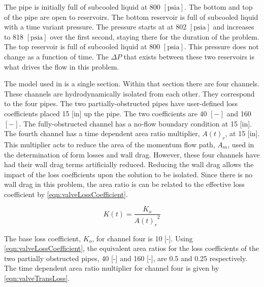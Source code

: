The pipe is initially full of subcooled liquid at 800 $[ \text{psia}] $.
The bottom and top of the pipe are open to reservoirs.
The bottom reservoir is full of subcooled liquid with a time variant pressure.
The pressure starts at at 802 $[ \text{psia} ] $ and increases to 818 $[ \text{psia}]$ over the first second, staying there for the duration of the problem.
The top reservoir is full of subcooled liquid at 800 $[\text{psia} ] $.
This pressure does not change as a function of time.
The $\Delta P$ that exists between these two reservoirs is what drives the flow in this problem.

The model used in \cobra{} is a single section.
Within that section there are four channels.
These channels are hydrodynamically isolated from each other.
They correspond to the four pipes.
The two partially-obstructed pipes have user-defined loss coefficients placed 15 [in] up the pipe.
The two coefficients are 40 $[-]$ and 160 $[-]$.
The fully-obstructed channel has a no-flow boundary condition at 15 [in].
The fourth channel has a time dependent area ratio multiplier, $A(t)_r$, at 15 [in].
This multiplier acts to reduce the area of the momentum flow path, $A_m$, used in the determination of form losses and wall drag.
However, these four channels have had their wall drag terms artificially reduced.
Reducing the wall drag allows the impact of the loss coefficients upon the solution to be isolated.
Since there is no wall drag in this problem, the area ratio is can be related to the effective loss coefficient by \eqref{eqn:valveLossCoefficient}.

\begin{equation}
\label{eqn:valveLossCoefficient}
K(t) = \frac{K_{o}}{{A(t)_r}^2}
\end{equation}

The base loss coefficient, $K_o$, for channel four is 10 [-].
Using \eqref{eqn:valveLossCoefficient}, the equivalent area ratios for the loss coefficients of the two partially obstructed pipes, 40 [-] and 160 [-], are 0.5 and 0.25 respectively.
The time dependent area ratio multiplier for channel four is given by \eqref{eqn:valveTransLoss}.

